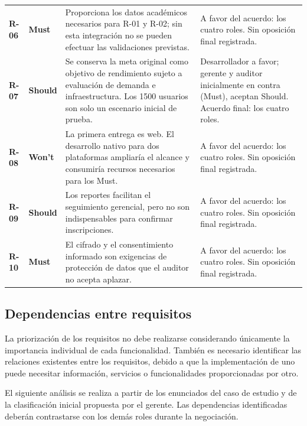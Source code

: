 \documentclass[12pt,a4paper]{article}
\begin{document}
\begin{longtable}{
    C{1.1cm}
    C{2.0cm}
    L{6.7cm}
    L{4.0cm}
}
\textbf{R-06} & \textbf{Must} & Proporciona los datos académicos necesarios para R-01 y R-02; sin esta integración no se pueden efectuar las validaciones previstas. & A favor del acuerdo: los cuatro roles. Sin oposición final registrada. \\

\textbf{R-07} & \textbf{Should} & Se conserva la meta original como objetivo de rendimiento sujeto a evaluación de demanda e infraestructura. Los 1500 usuarios son solo un escenario inicial de prueba. & Desarrollador a favor; gerente y auditor inicialmente en contra (Must), aceptan Should. Acuerdo final: los cuatro roles. \\

\textbf{R-08} & \textbf{Won't} & La primera entrega es web. El desarrollo nativo para dos plataformas ampliaría el alcance y consumiría recursos necesarios para los Must. & A favor del acuerdo: los cuatro roles. Sin oposición final registrada. \\

\textbf{R-09} & \textbf{Should} & Los reportes facilitan el seguimiento gerencial, pero no son indispensables para confirmar inscripciones. & A favor del acuerdo: los cuatro roles. Sin oposición final registrada. \\

\textbf{R-10} & \textbf{Must} & El cifrado y el consentimiento informado son exigencias de protección de datos que el auditor no acepta aplazar. & A favor del acuerdo: los cuatro roles. Sin oposición final registrada. \\

\end{longtable}

\endgroup

\subsection{Dependencias entre requisitos}

La priorización de los requisitos no debe realizarse
considerando únicamente la importancia individual de
cada funcionalidad. También es necesario identificar
las relaciones existentes entre los requisitos, debido
a que la implementación de uno puede necesitar
información, servicios o funcionalidades proporcionadas
por otro.

El siguiente análisis se realiza a partir de los
enunciados del caso de estudio y de la clasificación
inicial propuesta por el gerente. Las dependencias
identificadas deberán contrastarse con los demás roles
durante la negociación.
\end{document}
